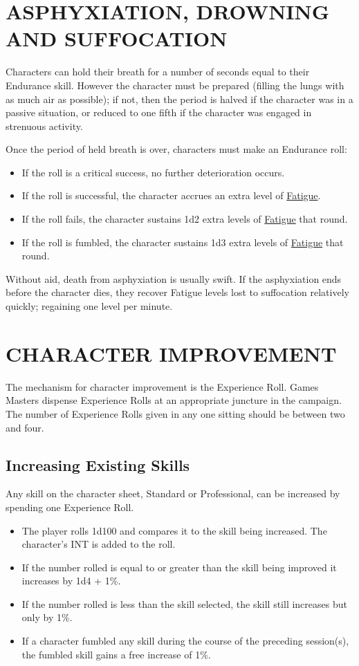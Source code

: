 \documentclass[10pt]{article}
\begin{document}
\section{ASPHYXIATION, DROWNING AND SUFFOCATION}
\label{sec:asphyxiation}
Characters can hold their breath for a number of seconds equal to their Endurance skill. However the character must be prepared (filling the lungs with as much air as possible); if not, then the period is halved if the character was in a passive situation, or reduced to one fifth if the character was engaged in strenuous activity.

Once the period of held breath is over, characters must make an Endurance roll:
\begin{itemize}[leftmargin=*]
    \item If the roll is a critical success, no further deterioration occurs.
    \item If the roll is successful, the character accrues an extra level of \hyperref[sec:fatigue]{Fatigue}.
    \item If the roll fails, the character sustains 1d2 extra levels of \hyperref[sec:fatigue]{Fatigue} that round.
    \item If the roll is fumbled, the character sustains 1d3 extra levels of \hyperref[sec:fatigue]{Fatigue} that round.
\end{itemize}
Without aid, death from asphyxiation is usually swift. If the asphyxiation ends before the character dies, they recover Fatigue levels lost to suffocation relatively quickly; regaining one level per minute.


\section{CHARACTER IMPROVEMENT}
\label{sec:improvement}
The mechanism for character improvement is the Experience Roll. Games Masters dispense Experience Rolls at an appropriate juncture in the campaign. The number of Experience Rolls given in any one sitting should be between two and four.

\subsection{Increasing Existing Skills}
\label{sec:skill-improvement}
Any skill on the character sheet, Standard or Professional, can be increased by spending one Experience Roll.
\begin{itemize}[leftmargin=*]
    \item The player rolls 1d100 and compares it to the skill being increased. The character's INT is added to the roll.
    \item If the number rolled is equal to or greater than the skill being improved it increases by 1d4 + 1\%.
    \item If the number rolled is less than the skill selected, the skill still increases but only by 1\%.
    \item If a character fumbled any skill during the course of the preceding session(s), the fumbled skill gains a free increase of 1\%.
\end{itemize}
\end{document}
